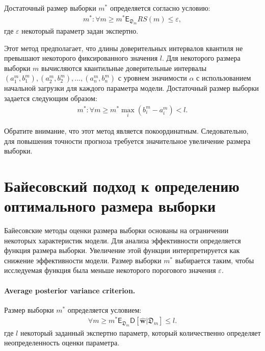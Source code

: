 Достаточный размер выборки $m^*$ определяется согласно условию:
\[
\label{eq:hb:7}
\begin{aligned}
	m^*: \forall m \geq m^* \mathsf{E}_{\mathfrak{D}_{m}}RS(m) \leq \varepsilon,
\end{aligned}
\]
где $\varepsilon$ некоторый параметр задан экспертно.

Этот метод предполагает, что длины доверительных интервалов квантиля не превышают некоторого фиксированного значения $l$. Для некоторого размера выборки $m$ вычисляются квантильные доверительные интервалы $\left (a^m_1, b^m_1\right), \left(a^m_2, b^m_2 \right), ..., \left(a^m_n, b^m_n \right)$ с уровнем значимости $\alpha$ с использованием начальной загрузки для каждого параметра модели. Достаточный размер выборки задается следующим образом:
\[
\label{eq:hb:8}
\begin{aligned}
	m^*: \forall m\geq m^* \max_i\left(b^m_i - a^m_i\right) < l.
\end{aligned}
\]
    
Обратите внимание, что этот метод является покоординатным. Следовательно, для повышения точности прогноза требуется значительное увеличение размера выборки.
    
\section{Байесовский подход к определению оптимального размера выборки}
Байесовские методы оценки размера выборки основаны на ограничении некоторых характеристик модели. Для анализа эффективности определяется функция размера выборки. Увеличение этой функции интерпретируется как снижение эффективности модели. Размер выборки $m^*$ выбирается таким, чтобы исследуемая функция была меньше некоторого порогового значения $\varepsilon$.

\paragraph{Average posterior variance criterion.}
Размер выборки $m^*$ определяется условием:
\[
\label{eq:bs:1}
\begin{aligned}
	\forall m \geq m^*    \mathsf{E}_{\mathfrak{D}_m}\mathsf{D}\left[\hat{\textbf{w}}|\mathfrak{D}_m\right] \leq l.
\end{aligned}
\]
где $l$ некоторый заданный экспертно параметр, который количественно определяет неопределенность оценки параметра.

